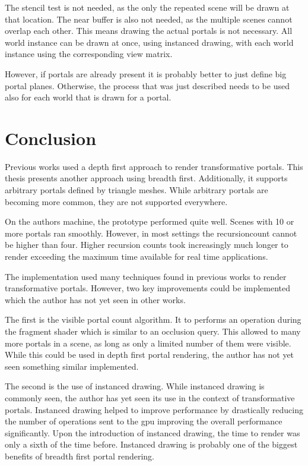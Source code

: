 The stencil test is not needed, as the only the repeated scene will be drawn at that location. The near buffer is also not needed, as the multiple scenes cannot overlap each other. This means drawing the actual portals is not necessary. All world instance can be drawn at once, using instanced drawing, with each world instance using the corresponding view matrix.

However, if portals are already present it is probably better to just define big portal planes. Otherwise, the process that was just described needs to be used also for each world that is drawn for a portal.


\chapter{Conclusion}


Previous works used a depth first approach to render transformative portals. This thesis presents another approach using breadth first. Additionally, it supports arbitrary portals defined by triangle meshes. While arbitrary portals are becoming more common, they are not supported everywhere.

On the authors machine, the prototype performed quite well. Scenes with 10 or more portals ran smoothly. However, in most settings the \gls{recursioncount} cannot be higher than four. Higher recursion counts took increasingly much longer to render exceeding the maximum time available for real time applications.



The implementation used many techniques found in previous works to render transformative portals. However, two key improvements could be implemented which the author has not yet seen in other works.

The first is the visible portal count algorithm. It to performs an operation during the fragment shader which is similar to an occlusion query. This allowed to many more portals in a scene, as long as only a limited number of them were visible. While this could be used in depth first portal rendering, the author has not yet seen something similar implemented.

The second is the use of instanced drawing. While instanced drawing is commonly seen, the author has yet seen its use in the context of transformative portals. Instanced drawing helped to improve performance by drastically reducing the number of operations sent to the \gls{gpu} improving the overall performance significantly. Upon the introduction of instanced drawing, the time to render was only a sixth of the time before. Instanced drawing is probably one of the biggest benefits of breadth first portal rendering.

